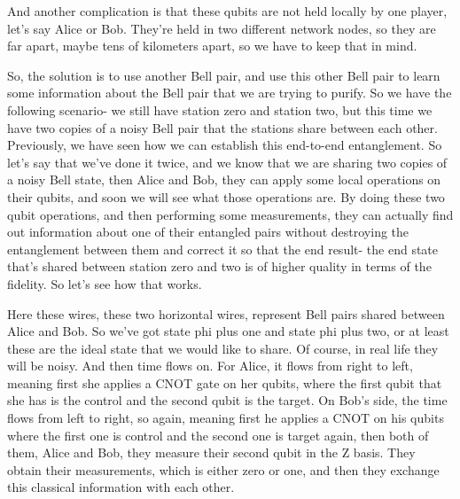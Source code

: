 And another complication is that these qubits are not held locally by one player, let's say Alice or Bob. They're held in two different network nodes, so they are far apart, maybe tens of kilometers apart, so we have to keep that in mind.

So, the solution is to use another Bell pair, and use this other Bell pair to learn some information about the Bell pair that we are trying to purify. So we have the following scenario- we still have station zero and station two, but this time we have two copies of a noisy Bell pair that the stations share between each other. Previously, we have seen how we can establish this end-to-end entanglement. So let's say that we've done it twice, and we know that we are sharing two copies of a noisy Bell state, then Alice and Bob, they can apply some local operations on their qubits, and soon we will see what those operations are. By doing these two qubit operations, and then performing some measurements, they can actually find out information about one of their entangled pairs without destroying the entanglement between them and correct it so that the end result- the end state that's shared between station zero and two is of higher quality in terms of the fidelity. So let's see how that works.

Here these wires, these two horizontal wires, represent Bell pairs shared between Alice and Bob. So we've got state phi plus one and state phi plus two, or at least these are the ideal state that we would like to share. Of course, in real life they will be noisy. And then time flows on. For Alice, it flows from right to left, meaning first she applies a CNOT gate on her qubits, where the first qubit that she has is the control and the second qubit is the target. On Bob's side, the time flows from left to right, so again, meaning first he applies a CNOT on his qubits where the first one is control and the second one is target again, then both of them, Alice and Bob, they measure their second qubit in the Z basis. They obtain their measurements, which is either zero or one, and then they exchange this classical information with each other.

